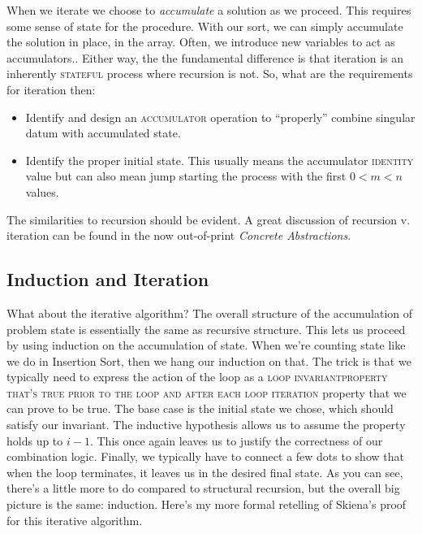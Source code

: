 \documentclass[]{tufte-handout}
\begin{document}
When we iterate we choose to \textit{accumulate} a solution as we proceed. This requires some sense of state for the procedure. With our sort, we can simply accumulate the solution in place, in the array.  Often, we introduce new variables to act as accumulators..  Either way, the the fundamental difference is that iteration is an inherently \textsc{stateful} process where recursion is not. So, what are the requirements for iteration then:
\begin{itemize}
\item Identify and design an \textsc{accumulator} operation to ``properly'' combine singular datum with accumulated state.  
\item Identify the proper initial state. This usually means the accumulator \textsc{identity} value but can also mean jump starting the process with the first $0<m<n$ values.   
\end{itemize}
The similarities to recursion should be evident. A great discussion of recursion v. iteration can be found in the now out-of-print \textit{Concrete Abstractions}.

\subsection{Induction and Iteration}

What about the iterative algorithm? The overall structure of the accumulation of problem state is essentially the same as recursive structure. This lets us proceed by using induction on the accumulation of state. When we're counting state like we do in Insertion Sort, then we hang our induction on that. The trick is that we typically need to express the action of the loop as a \textsc{loop invariant}\textsc{property that's true prior to the loop and after each loop iteration} property that we can prove to be true.  The base case is the initial state we chose, which should satisfy our invariant. The inductive hypothesis allows us to assume the property holds up to $i-1$.  This once again leaves us to justify the correctness of our combination logic. Finally, we typically have to connect a few dots to show that when the loop terminates, it leaves us in the desired final state.  As you can see, there's a little more to do compared to structural recursion, but the overall big picture is the same: induction. Here's my more formal retelling of Skiena's proof for this iterative algorithm. 
\end{document}
